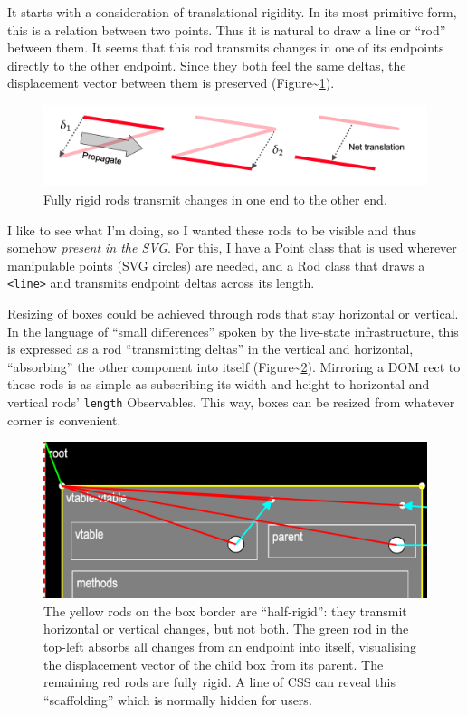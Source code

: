 It starts with a consideration of translational rigidity. In its most
primitive form, this is a relation between two points. Thus it is
natural to draw a line or ``rod'' between them. It seems that this rod
transmits changes in one of its endpoints directly to the other
endpoint. Since they both feel the same deltas, the displacement vector
between them is preserved
(Figure\textasciitilde{}\ref{fig:delta-transmission}).

\begin{figure}[h]
  \centering
  \includegraphics[width=\textwidth]{../delta-transmission.png}
  \caption{Fully rigid rods transmit changes in one end to the other end. \label{fig:delta-transmission}}
\end{figure}

I like to see what I'm doing, so I wanted these rods to be visible and
thus somehow \emph{present in the SVG}. For this, I have a Point class
that is used wherever manipulable points (SVG circles) are needed, and a
Rod class that draws a \texttt{\textless{}line\textgreater{}} and
transmits endpoint deltas across its length.

Resizing of boxes could be achieved through rods that stay horizontal or
vertical. In the language of ``small differences'' spoken by the
live-state infrastructure, this is expressed as a rod ``transmitting
deltas'' in the vertical and horizontal, ``absorbing'' the other
component into itself (Figure\textasciitilde{}\ref{fig:rods}). Mirroring
a DOM rect to these rods is as simple as subscribing its width and
height to horizontal and vertical rods' \texttt{length} Observables.
This way, boxes can be resized from whatever corner is convenient.

\begin{figure}[h]
  \centering
  \includegraphics[width=\textwidth]{../rods.png}
  \caption{The yellow rods on the box border are ``half-rigid'': they transmit horizontal or vertical changes, but not both. The green rod in the top-left absorbs all changes from an endpoint into itself, visualising the displacement vector of the child box from its parent. The remaining red rods are fully rigid. A line of CSS can reveal this ``scaffolding'' which is normally hidden for users. \label{fig:rods}}
\end{figure}


